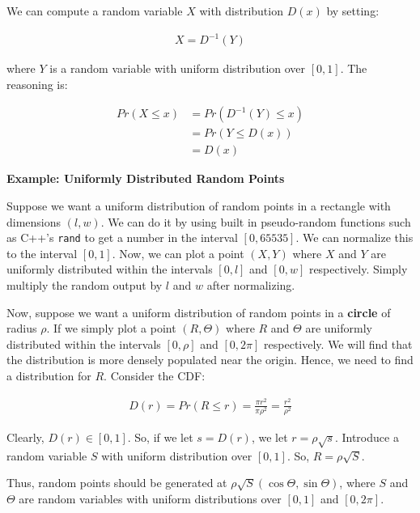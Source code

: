 \documentclass[11pt]{article}
\begin{document}
We can compute a random variable \(X\) with distribution \(D\left( x \right)\) by setting:

\begin{align*}
    X = D^{-1}\left( Y \right)
\end{align*}

where \(Y\) is a random variable with uniform distribution over \(\left[0, 1\right]\). The reasoning is:

\begin{align*}
    Pr\left( X \leq x \right) &= Pr\left( D^{-1}\left(Y\right) \leq x \right) \\
    &= Pr\left(Y \leq D\left( x \right)\right) \\
    &= D\left( x \right)
\end{align*}

\textbf{Example: Uniformly Distributed Random Points}

Suppose we want a uniform distribution of random points in a rectangle with dimensions \(\left(l,w\right)\). We can do it by using built in pseudo-random functions such as C++'s \texttt{rand} to get a number in the interval \(\left[0,65535\right]\). We can normalize this to the interval \(\left[0,1\right]\). Now, we can plot a point \(\left(X,Y\right)\) where \(X\) and \(Y\) are uniformly distributed within the intervals \(\left[0,l\right]\) and \(\left[0,w\right]\) respectively. Simply multiply the random output by \(l\) and \(w\) after normalizing.

Now, suppose we want a uniform distribution of random points in a \textbf{circle} of radius \(\rho\). If we simply plot a point \(\left(R,\Theta\right)\) where \(R\) and \(\Theta\) are uniformly distributed within the intervals \(\left[0,\rho\right]\) and \(\left[0,2\pi\right]\) respectively. We will find that the distribution is more densely populated near the origin. Hence, we need to find a distribution for \(R\). Consider the CDF:

\begin{align*}
    D\left( r \right) = Pr\left( R \leq r \right) = \frac{\pi r^{2}}{\pi \rho^{2}} = \frac{r^{2}}{\rho^{2}}
\end{align*}

Clearly, \(D\left( r \right) \in \left[0,1\right]\). So, if we let \(s = D\left( r \right)\), we let \(r = \rho\sqrt{s}\). Introduce a random variable \(S\) with uniform distribution over \(\left[0,1\right]\). So, \(R = \rho\sqrt{S}\).

Thus, random points should be generated at \(\rho\sqrt{S}\left(\cos\Theta,\sin\Theta\right)\), where \(S\) and \(\Theta\) are random variables with uniform distributions over \(\left[0,1\right]\) and \(\left[0,2\pi\right]\).
\end{document}
